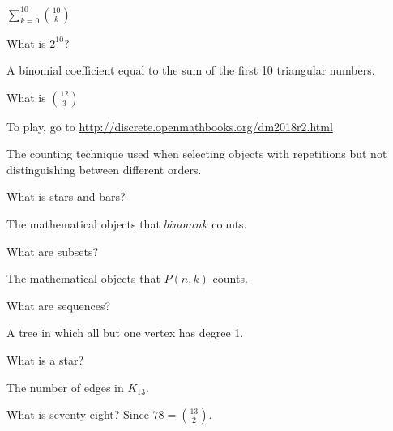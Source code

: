 \documentclass[10pt]{exam}
\begin{document}
\begin{questions}
\question \(\sum_{k = 0}^{10} \binom{10}{k}\)

\begin{solution}
	What is \(2^{10}\)?
\end{solution}


\question A binomial coefficient equal to the sum of the first 10 triangular numbers.

\begin{solution}
	What is \(\binom{12}{3}\)
\end{solution}


\newpage




To play, go to \url{http://discrete.openmathbooks.org/dm2018r2.html}





% 


\question The counting technique used when selecting objects with repetitions but not distinguishing between different orders.

\begin{solution}
  What is stars and bars?
\end{solution}

\question The mathematical objects that \(binom{n}{k}\) counts.

\begin{solution}
	What are subsets?
\end{solution}

\question The mathematical objects that \(P(n,k)\) counts.

\begin{solution}
	What are sequences?
\end{solution}

\question A tree in which all but one vertex has degree 1.

\begin{solution}
  What is a star?
\end{solution}

\question The number of edges in \(K_{13}\).

\begin{solution}
	What is seventy-eight?  Since \(78 = \binom{13}{2}\).
\end{solution}



\end{questions}
\end{document}
